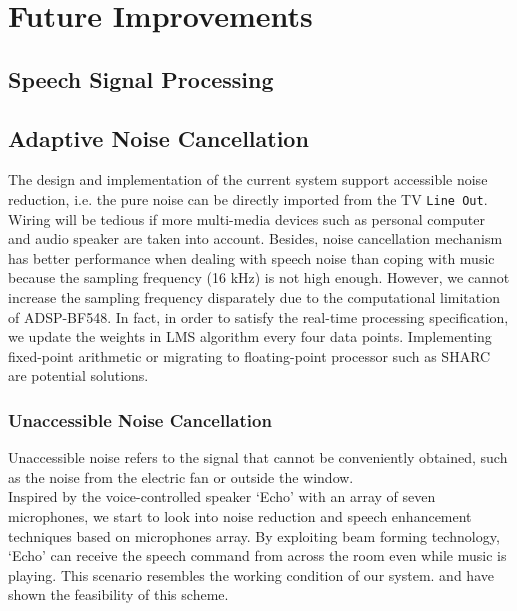 
\section{Future Improvements}

\subsection{Speech Signal Processing}


\subsection{Adaptive Noise Cancellation}

The design and implementation of the current system support accessible noise reduction, i.e. the pure noise can be directly imported from the TV \texttt{Line Out}. Wiring will be tedious if more multi-media devices such as personal computer and audio speaker are taken into account. Besides, noise cancellation mechanism has better performance when dealing with speech noise than coping with music because the sampling frequency (16 kHz) is not high enough. However, we cannot increase the sampling frequency disparately due to the computational limitation of ADSP-BF548. In fact, in order to satisfy the real-time processing specification, we update the weights in LMS algorithm every four data points. Implementing fixed-point arithmetic or migrating to floating-point processor such as SHARC\textsuperscript{\textregistered} are potential solutions.


\subsubsection{Unaccessible Noise Cancellation}

Unaccessible noise refers to the signal that cannot be conveniently obtained, such as the noise from the electric fan or outside the window.\\

Inspired by the voice-controlled speaker `Echo' with an array of seven microphones, we start to look into noise reduction and speech enhancement techniques based on microphones array. By exploiting beam forming technology, `Echo' can receive the speech command from across the room even while music is playing. This scenario resembles the working condition of our system. \cite{mccowan2003microphone} and \cite{spalt2011background} have shown the feasibility of this scheme.

